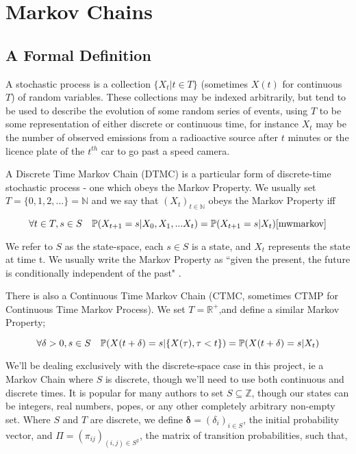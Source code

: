 \section{Markov Chains}

\subsection{A Formal Definition}

A stochastic process \cite[p590]{doob96} is a collection $\{X_t  | t \in T\}$ (sometimes $X(t)$ for continuous $T$) of random variables. These collections may be indexed arbitrarily, but tend to be used to describe the evolution of some random series of events, using $T$ to be some representation of either discrete or continuous time, for instance $X_t$ may be the number of observed emissions from a radioactive source after $t$ minutes or the licence plate of the $t^{th}$ car to go past a speed camera.

A Discrete Time Markov Chain (DTMC) is a particular form of discrete-time stochastic process - one which obeys the Markov Property. We usually set $T=\{0,1,2,...\}=\mathbb{N}$ and we say that $(X_t)_{t \in \mathbb{N}}$ obeys the Markov Property iff

$$
\forall t \in T, s \in S \quad \mathbb{P} (X_{t+1} = s | X_0, X_1, ... X_t) = \mathbb{P} (X_{t+1} = s | X_t)\cite{mwmarkov}
$$

We refer to $S$ as the state-space, each $s \in S$ is a state, and $X_t$ represents the state at time t. We usually write the Markov Property as ``given the present, the future is conditionally independent of the past" \cite{mwmarkov}.

There is also a Continuous Time Markov Chain (CTMC, sometimes CTMP for Continuous Time Markov Process). We set $T=\mathbb{R}^{+}$,and define a similar Markov Property;

$$
\forall \delta > 0, s \in S \quad \mathbb{P} (X(t+\delta) = s | \{X(\tau), \tau < t\}) = \mathbb{P} (X(t+\delta) = s | X_t)
$$

We'll be dealing exclusively with the discrete-space case in this project, ie a Markov Chain where $S$ is discrete, though we'll need to use both continuous and discrete times. It is popular for many authors to set $S \subseteq \mathbb{Z}$, though our states can be integers, real numbers, popes, or any other completely arbitrary non-empty set. Where $S$ and $T$ are discrete, we define $\mathbf{\delta} = (\delta_i)_{i \in S}$, the initial probability vector, and $\Pi = (\pi_{ij})_{(i,j) \in S^2}$, the matrix of transition probabilities, such that,

